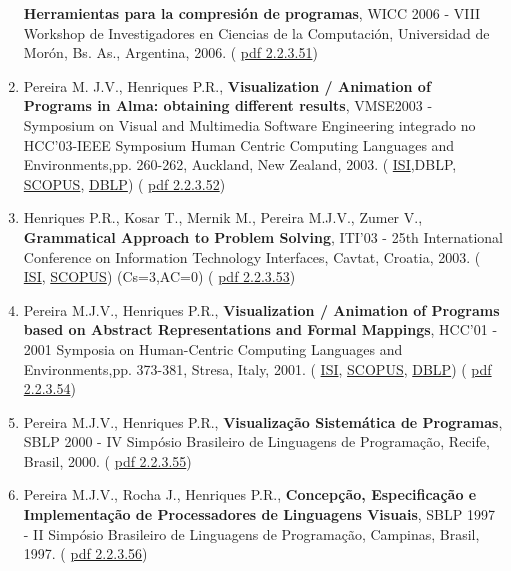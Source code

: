 \documentclass[11pt]{article}
\begin{document}
\begin{enumerate}
{{\bf{ Herramientas para la compresión de programas}}, WICC 2006 - VIII Workshop de Investigadores en Ciencias de la Computación, Universidad de Morón, Bs. As., Argentina, 2006. (
\href{run:Publicacoes/publicacoes/17.pdf}{pdf 2.2.3.51})}
\item{Pereira M. J.V., Henriques P.R., {
\bf{ Visualization / Animation of Programs in Alma: obtaining different results}}, VMSE2003 - Symposium on Visual and Multimedia Software Engineering integrado no HCC'03-IEEE Symposium Human Centric Computing Languages and Environments,pp. 260-262, Auckland, New Zealand, 2003. (
\href{run:Publicacoes/ComprovativosISI.pdf}{ISI},DBLP, 
\href{run:Publicacoes/PublicacoesSCOPUS.pdf}{SCOPUS}, 
\href{run:Publicacoes/ComprovativosDBLP.pdf}{DBLP}) (
\href{run:Publicacoes/publicacoes/9.pdf}{pdf 2.2.3.52})}
\item{Henriques P.R., Kosar T., Mernik M., Pereira M.J.V., Zumer V., {
\bf{ Grammatical Approach to Problem Solving}}, ITI'03 - 25th International Conference on Information Technology Interfaces, Cavtat, Croatia, 2003. (
\href{run:Publicacoes/ComprovativosISI.pdf}{ISI}, 
\href{run:Publicacoes/PublicacoesSCOPUS.pdf}{SCOPUS}) (Cs=3,AC=0) (
\href{run:Publicacoes/publicacoes/7.pdf}{pdf 2.2.3.53})}
\item{Pereira M.J.V., Henriques P.R., {
\bf{ Visualization / Animation of Programs based on Abstract Representations and Formal Mappings}}, HCC'01 - 2001 Symposia on Human-Centric Computing Languages and Environments,pp. 373-381, Stresa, Italy, 2001. (
\href{run:Publicacoes/ComprovativosISI.pdf}{ISI}, 
\href{run:Publicacoes/PublicacoesSCOPUS.pdf}{SCOPUS}, 
\href{run:Publicacoes/ComprovativosDBLP.pdf}{DBLP}) (
\href{run:Publicacoes/publicacoes/5.pdf}{pdf 2.2.3.54})}
\item{Pereira M.J.V., Henriques P.R., {
\bf{ Visualização Sistemática de Programas}}, SBLP 2000 - IV Simpósio Brasileiro de Linguagens de Programação, Recife, Brasil, 2000. (
\href{run:Publicacoes/publicacoes/4.pdf}{pdf 2.2.3.55})}
\item{Pereira M.J.V., Rocha J., Henriques P.R., {
\bf{ Concepção, Especificação e Implementação de Processadores de Linguagens Visuais}}, SBLP 1997 - II Simpósio Brasileiro de Linguagens de Programação, Campinas, Brasil, 1997. (
\href{run:Publicacoes/publicacoes/2.pdf}{pdf 2.2.3.56})}
\end{enumerate} 
\end{document}
